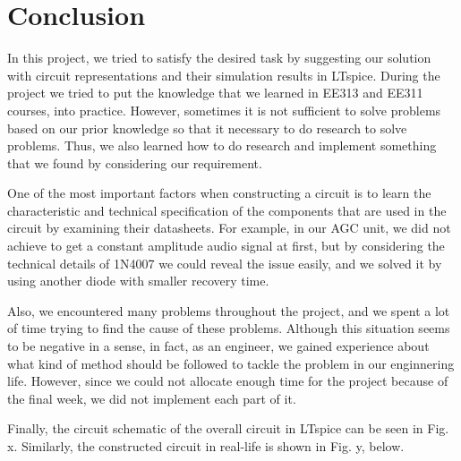\documentclass[conference]{IEEEtran}
\begin{document}
\section{Conclusion}
In this project, we tried to satisfy the desired task by suggesting our solution with circuit representations and their simulation results in LTspice. During the project we tried to put the knowledge that we learned in EE313 and EE311 courses, into practice. However, sometimes it is not sufficient to solve problems based on our prior knowledge so that it necessary to do research to solve problems. Thus, we also learned how to do research and implement something that we found by considering our requirement. \\
\par  One of the most important factors when constructing a circuit is to learn the characteristic and technical specification of the components that are used in the circuit by examining their datasheets. For example, in our AGC unit, we did not achieve to get a constant amplitude audio signal at first, but by considering the technical details of 1N4007 we could reveal the issue easily, and we solved it by using another diode with smaller recovery time. \\
\par Also, we encountered many problems throughout the project, and we spent a lot of time trying to find the cause of these problems. Although this situation seems to be negative in a sense, in fact, as an engineer, we gained experience about what kind of method should be followed to tackle the problem in our enginnering life. However, since we could not allocate enough time for the project because of the final week, we did not implement each part of it. \\
\par Finally, the circuit schematic of the overall circuit in LTspice can be seen in Fig. x. Similarly, the constructed circuit in real-life is shown in Fig. y, below.  


\end{document}
